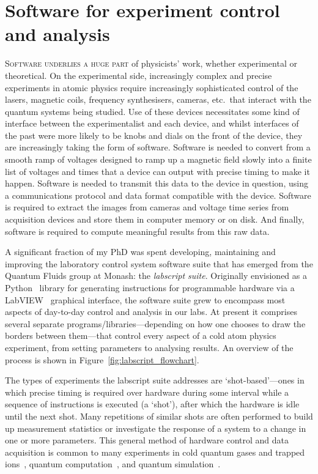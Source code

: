 \chapter{Software for experiment control and analysis}\label{chap:software}

\lettrine[lines=3]{S}{oftware underlies a huge part} of physicists' work, whether experimental or theoretical. On the experimental side, increasingly complex and precise experiments in atomic physics require increasingly sophisticated control of the lasers, magnetic coils, frequency synthesisers, cameras, etc.~that interact with the quantum systems being studied. Use of these devices necessitates some kind of interface between the experimentalist and each device, and whilst interfaces of the past were more likely to be knobs and dials on the front of the device, they are increasingly taking the form of software. Software is needed to convert from a smooth ramp of voltages designed to ramp up a magnetic field slowly into a finite list of voltages and times that a device can output with precise timing to make it happen. Software is needed to transmit this data to the device in question, using a communications protocol and data format compatible with the device. Software is required to extract the images from cameras and voltage time series from acquisition devices and store them in computer memory or on disk. And finally, software is required to compute meaningful results from this raw data.

A significant fraction of my PhD was spent developing, maintaining and improving the laboratory control system software suite that has emerged from the Quantum Fluids group at Monash: the \emph{labscript suite}. Originally envisioned as a Python~\cite{python_software_foundation_python_2018} library for generating instructions for programmable hardware via a LabVIEW~\cite{national_instruments_laboratory_2018} graphical interface, the software suite grew to encompass most aspects of day-to-day control and analysis in our labs. At present it comprises several separate programs/libraries---depending on how one chooses to draw the borders between them---that control every aspect of a cold atom physics experiment, from setting parameters to analysing results. An overview of the process is shown in Figure~\ref{fig:labscript_flowchart}.

The types of experiments the labscript suite addresses are `shot-based'---ones in which precise timing is required over hardware during some interval while a sequence of instructions is executed (a `shot'), after which the hardware is idle until the next shot. Many repetitions of similar shots are often performed to build up measurement statistics or investigate the response of a system to a change in  one or more parameters. This general method of hardware control and data acquisition is common to many experiments in cold quantum gases and trapped ions~\cite{robins_atom_2013-1, cronin_optics_2009-1}, quantum computation~\cite{negretti_quantum_2011-1, ladd_quantum_2010-1}, and quantum simulation~\cite{bloch_quantum_2012-1, blatt_quantum_2012-1}.

